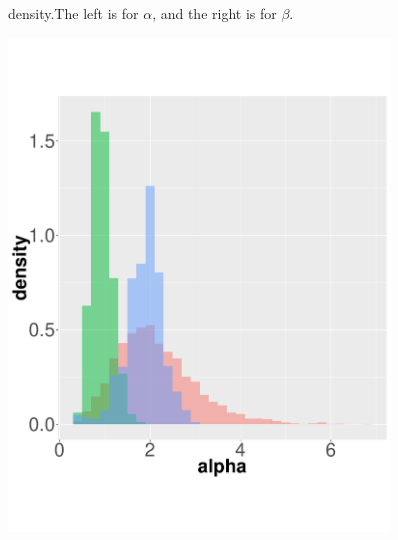 \begin{figure}
\begin{minipage}[!hp]{0.45\linewidth}
    \vspace{-0 in}
  \end{minipage}
    \caption{density.The left is for $\alpha$, and the right is for $\beta$.}
     \label{fig:dist}
  \end{figure}

  \begin{figure}%
  \begin{minipage}[hp]{0.45\linewidth}
  \centering
    \includegraphics [width=0.90\textwidth, angle=0]{figs/hist_alpha.pdf}
    \vspace{-0 in}
  \end{minipage}
  \begin{minipage}[!hp]{0.45\linewidth}
  \centering

\end{minipage}
\end{figure}

